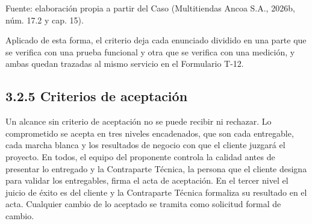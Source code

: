 \documentclass[11pt]{article}
\begin{document}
Fuente: elaboración propia a partir del Caso (Multitiendas Ancoa S.A., 2026b, núm. 17.2 y cap. 15).

Aplicado de esta forma, el criterio deja cada enunciado dividido en una parte que se verifica con una prueba funcional y otra que se verifica con una medición, y ambas quedan trazadas al mismo servicio en el Formulario T-12.

\subsection{3.2.5 Criterios de aceptación}

Un alcance sin criterio de aceptación no se puede recibir ni rechazar. Lo comprometido se acepta en tres niveles encadenados, que son cada entregable, cada marcha blanca y los resultados de negocio con que el cliente juzgará el proyecto. En todos, el equipo del proponente controla la calidad antes de presentar lo entregado y la Contraparte Técnica, la persona que el cliente designa para validar los entregables, firma el acta de aceptación. En el tercer nivel el juicio de éxito es del cliente y la Contraparte Técnica formaliza su resultado en el acta. Cualquier cambio de lo aceptado se tramita como solicitud formal de cambio.

\end{document}
